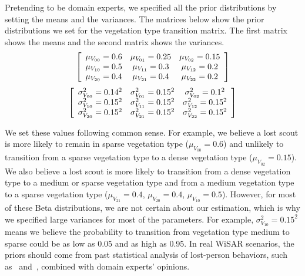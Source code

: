 Pretending to be domain experts, we specified all the prior distributions by setting the means and the variances. The matrices below show the prior distributions we set for the vegetation type transition matrix. The first matrix shows the means and the second matrix shows the variances.
\begin{equation}
\centering
\left[
\begin{array}{ccc}
\mu_{V_{00}}=0.6 & \mu_{V_{01}}=0.25 & \mu_{V_{02}}=0.15  \\
\mu_{V_{10}}=0.5 & \mu_{V_{11}}=0.3 & \mu_{V_{12}}=0.2  \\
\mu_{V_{20}}=0.4 & \mu_{V_{21}}=0.4 & \mu_{V_{22}}=0.2  \\
\end{array}
\right]
\end{equation}
\begin{equation}
\centering
\left[
\begin{array}{ccc}
\sigma^2_{V_{00}}=0.14^2 & \sigma^2_{V_{01}}=0.15^2 & \sigma^2_{V_{02}}=0.1^2 \\
\sigma^2_{V_{10}}=0.15^2 & \sigma^2_{V_{11}}=0.15^2 & \sigma^2_{V_{12}}=0.15^2 \\
\sigma^2_{V_{20}}=0.15^2 & \sigma^2_{V_{21}}=0.15^2 & \sigma^2_{V_{22}}=0.15^2 \\
\end{array}
\right]
\end{equation}

We set these values following common sense. For example, we believe a lost scout is more likely to remain in sparse vegetation type ($\mu_{V_{00}}=0.6$) and unlikely to transition from a sparse vegetation type to a dense vegetation type ($\mu_{V_{02}}=0.15$). We also believe a lost scout is more likely to transition from a dense vegetation type to a medium or sparse vegetation type and from a medium vegetation type to a sparse vegetation type ($\mu_{V_{21}}=0.4$, $\mu_{V_{20}}=0.4$, $\mu_{V_{10}}=0.5$). However, for most of these Beta distributions, we are not certain about our estimation, which is why we specified large variances for most of the parameters. For example, $\sigma^2_{V_{10}}=0.15^2$ means we believe the probability to transition from vegetation type medium to sparse could be as low as 0.05 and as high as 0.95. In real WiSAR scenarios, the priors should come from past statistical analysis of lost-person behaviors, such as~\cite{Heth1998Characteristics} and~\cite{Syrotuck2000Analysis}, combined with domain experts' opinions.

